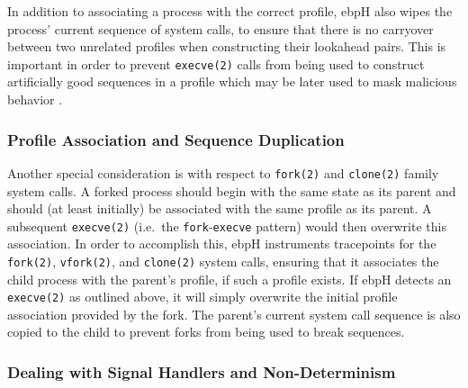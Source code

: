 \documentclass[
  12pt]{findlay}
\newcommand{\passthrough}[1]{#1}
\begin{document}
In addition to associating a process with the correct profile, ebpH also
wipes the process' current sequence of system calls, to ensure that
there is no carryover between two unrelated profiles when constructing
their lookahead pairs. This is important in order to prevent
\passthrough{\lstinline!execve(2)!} calls from being used to construct
artificially good sequences in a profile which may be later used to mask
malicious behavior \autocite{soma02}.

\hypertarget{profile-association-and-sequence-duplication}{%
\subsubsection{Profile Association and Sequence
Duplication}\label{profile-association-and-sequence-duplication}}

Another special consideration is with respect to
\passthrough{\lstinline!fork(2)!} and \passthrough{\lstinline!clone(2)!}
family system calls. A forked process should begin with the same state
as its parent and should (at least initially) be associated with the
same profile as its parent. A subsequent
\passthrough{\lstinline!execve(2)!} (i.e.~the
\passthrough{\lstinline!fork!}-\passthrough{\lstinline!execve!} pattern)
would then overwrite this association. In order to accomplish this, ebpH
instruments tracepoints for the \passthrough{\lstinline!fork(2)!},
\passthrough{\lstinline!vfork(2)!}, and
\passthrough{\lstinline!clone(2)!} system calls, ensuring that it
associates the child process with the parent's profile, if such a
profile exists. If ebpH detects an \passthrough{\lstinline!execve(2)!}
as outlined above, it will simply overwrite the initial profile
association provided by the fork. The parent's current system call
sequence is also copied to the child to prevent forks from being used to
break sequences.

\hypertarget{dealing-with-signal-handlers-and-non-determinism}{%
\subsubsection{Dealing with Signal Handlers and
Non-Determinism}\label{dealing-with-signal-handlers-and-non-determinism}}

\label{non_determinism}
\end{document}
